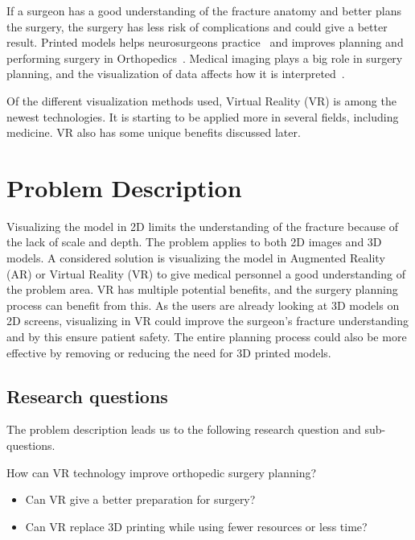 \documentclass[a4paper]{report}
\begin{document}
If a surgeon has a good understanding of the fracture anatomy and better plans the surgery,
the surgery has less risk of complications and could give a better result.
Printed models helps neurosurgeons practice~\cite{shahrubudin_overview_2019} and improves planning and performing surgery in Orthopedics~\cite{chen_efficacy_2019}.
Medical imaging plays a big role in surgery planning, and the visualization of data affects how it is interpreted~\cite{bradley_history_2008}.

Of the different visualization methods used, Virtual Reality (VR) is among the newest technologies. It is starting to be applied more in several fields, including medicine. VR also has some unique benefits discussed later.


\section{Problem Description}
Visualizing the model in 2D limits the understanding of the fracture because of the lack of scale and depth. The problem applies to both 2D images and 3D models.
A considered solution is visualizing the model in Augmented Reality (AR) or Virtual Reality (VR) to give medical personnel a good understanding of the problem area.
VR has multiple potential benefits, and the surgery planning process can benefit from this. As the users are already looking at 3D models on 2D screens, visualizing in VR could improve the surgeon's fracture understanding and by this ensure patient safety.
The entire planning process could also be more effective by removing or reducing the need for 3D printed models.

\subsection{Research questions}
The problem description leads us to the following research question and sub-questions.

How can VR technology improve orthopedic surgery planning?

\begin{itemize}
	\item Can VR give a better preparation for surgery?
	\item Can VR replace 3D printing while using fewer resources or less time?
\end{itemize}

\end{document}
